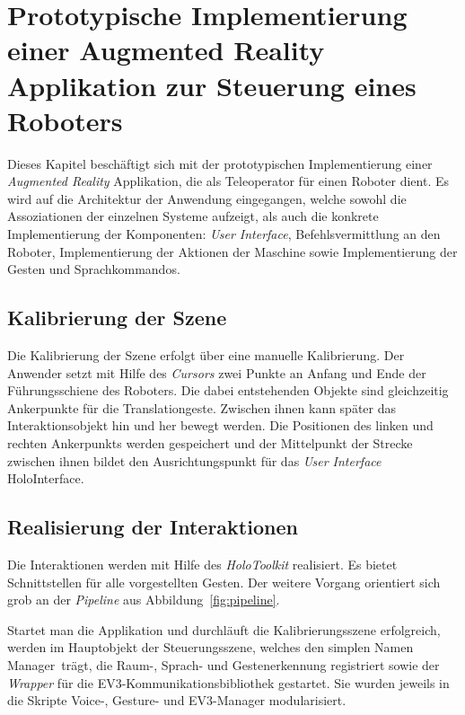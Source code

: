 \chapter{Prototypische Implementierung einer Augmented Reality Applikation zur Steuerung eines Roboters}\label{chap:appImplementation}
Dieses Kapitel beschäftigt sich mit der prototypischen Implementierung einer \textit{Augmented Reality} Applikation, die als Teleoperator für einen Roboter dient. Es wird auf die Architektur der Anwendung eingegangen, welche sowohl die Assoziationen der einzelnen Systeme aufzeigt, als auch die konkrete Implementierung der Komponenten: \textit{User Interface}, Befehlsvermittlung an den Roboter, Implementierung der Aktionen der Maschine sowie Implementierung der Gesten und Sprachkommandos.
\section{Kalibrierung der Szene}\label{sec:calibrateScene}
Die Kalibrierung der Szene erfolgt über eine manuelle Kalibrierung. Der Anwender setzt mit Hilfe des \textit{Cursors} zwei Punkte an Anfang und Ende der Führungsschiene des Roboters. Die dabei entstehenden Objekte sind gleichzeitig Ankerpunkte für die Translationgeste. Zwischen ihnen kann später das Interaktionsobjekt hin und her bewegt werden. Die Positionen des linken und rechten Ankerpunkts werden gespeichert und der Mittelpunkt der Strecke zwischen ihnen bildet den Ausrichtungspunkt für das \textit{User Interface} \frqq HoloInterface\flqq.
\section{Realisierung der Interaktionen}\label{sec:implementInteractions}
Die Interaktionen werden mit Hilfe des \textit{HoloToolkit} realisiert. Es bietet Schnittstellen für alle vorgestellten Gesten. Der weitere Vorgang orientiert sich grob an der \textit{Pipeline} aus Abbildung~\ref{fig:pipeline}.

Startet man die Applikation und durchläuft die Kalibrierungsszene erfolgreich, werden im Hauptobjekt der Steuerungsszene, welches den simplen Namen \frqq Manager\flqq\ trägt, die Raum-, Sprach- und Gestenerkennung registriert sowie der \textit{Wrapper} für die EV3-Kommunikationsbibliothek gestartet. Sie wurden jeweils in die Skripte \frqq Voice\flqq-, \frqq Gesture\flqq- und \frqq EV3\flqq-Manager modularisiert.
